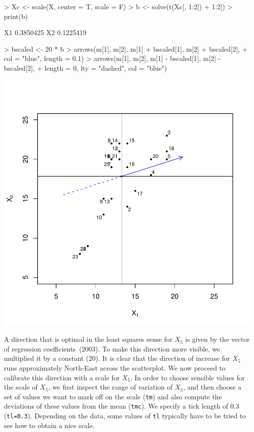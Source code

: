 \documentclass[a4paper]{article}
\begin{document}
\begin{Schunk}
\begin{Sinput}
> Xc <- scale(X, center = T, scale = F)
> b <- solve(t(Xc[, 1:2]) %
+     1:2]) %
> print(b)
\end{Sinput}
\begin{Soutput}
        [,1]
X1 0.3850425
X2 0.1225419
\end{Soutput}
\begin{Sinput}
> bscaled <- 20 * b
> arrows(m[1], m[2], m[1] + bscaled[1], m[2] + bscaled[2], 
+     col = "blue", length = 0.1)
> arrows(m[1], m[2], m[1] - bscaled[1], m[2] - bscaled[2], 
+     length = 0, lty = "dashed", col = "blue")
\end{Sinput}
\end{Schunk}
\includegraphics{CalibrationGuide-005}

A direction that is optimal in the least squares sense for $X_5$ is given by the vector of regression
coefficients~(2003). To make this direction more visible, we multiplied it by a constant (20). 
It is clear that the direction of increase for $X_5$ runs approximately North-East across the scatterplot. 
We now proceed to calibrate this direction with a scale for $X_5$. In order to choose sensible values for
the scale of $X_5$, we first inspect the range of variation of $X_5$, and then choose a set of values we want
to mark off on the scale ({\tt tm}) and also compute the deviations of these values from the mean 
({\tt tmc}). We specify a tick length of 0.3 ({\tt tl=0.3}). Depending on the data, some values of {\tt tl}
typically have to be tried to see how to obtain a nice scale. 
\end{document}
